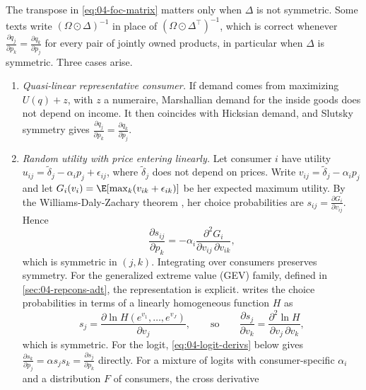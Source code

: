 \begin{remark}\label{rem:04-symmetry}
The transpose in \eqref{eq:04-foc-matrix} matters only when $\Delta$ is not symmetric. Some texts write
$(\Omega \odot \Delta)^{-1}$ in place of $(\Omega \odot \Delta^\top)^{-1}$, which is correct whenever
$\frac{\partial q_j}{\partial p_k} = \frac{\partial q_k}{\partial p_j}$ for every pair of jointly owned products, in
particular when $\Delta$ is symmetric. Three cases arise.
\begin{enumerate}[label=(\roman*)]
  \item \emph{Quasi-linear representative consumer.} If demand comes from maximizing $U(q) + z$, with $z$ a
  numeraire, Marshallian demand for the inside goods does not depend on income. It then coincides with Hicksian
  demand, and Slutsky symmetry gives $\frac{\partial q_j}{\partial p_k} = \frac{\partial q_k}{\partial p_j}$.
  \item \emph{Random utility with price entering linearly.} Let consumer $i$ have utility
  $u_{ij} = \tilde\delta_j - \alpha_i p_j + \epsilon_{ij}$, where $\tilde\delta_j$ does not depend on prices.
  Write $v_{ij} = \tilde\delta_j - \alpha_i p_j$ and let
  $G_i(v_i) = \E[\max_{k}(v_{ik} + \epsilon_{ik})]$ be her expected maximum utility. By the Williams-Daly-Zachary
  theorem \citep{McFadden1981}, her choice probabilities are $s_{ij} = \frac{\partial G_i}{\partial v_{ij}}$.
  Hence
  \begin{equation*}
  \frac{\partial s_{ij}}{\partial p_k} = -\alpha_i\frac{\partial^2 G_i}{\partial v_{ij}\,\partial v_{ik}},
  \end{equation*}
  which is symmetric in $(j, k)$. Integrating over consumers preserves symmetry. For the generalized extreme
  value (GEV) family, defined in \cref{sec:04-repcons-adt}, the representation is explicit. \citet[eq.~3.31, p.~1421]{McFadden1984} writes the choice
  probabilities in terms of a linearly homogeneous function $H$ as
  \begin{equation*}
  s_j = \frac{\partial\ln H(e^{v_1}, \dots, e^{v_J})}{\partial v_j},
  \qquad\text{so}\qquad
  \frac{\partial s_j}{\partial v_k} = \frac{\partial^2\ln H}{\partial v_j\,\partial v_k},
  \end{equation*}
  which is symmetric. For the logit, \eqref{eq:04-logit-derivs} below gives
  $\frac{\partial s_k}{\partial p_j} = \alpha s_js_k = \frac{\partial s_j}{\partial p_k}$ directly. For a mixture
  of logits with consumer-specific $\alpha_i$ and a distribution $F$ of consumers, the cross derivative

\end{enumerate}
\end{remark}
